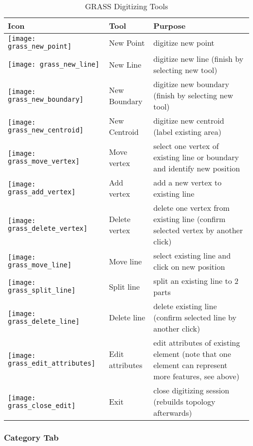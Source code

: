 \begin{table}[h]
\centering
\caption{GRASS Digitizing Tools}\label{tab:grass_tools}\medskip
 \begin{tabular}{|l|l|p{5in}|}
 \hline \textbf{Icon} & \textbf{Tool} & \textbf{Purpose} \\
\hline \texttt{[image: grass\_new\_point]} & New Point & digitize new point \\
\hline \texttt{[image: grass\_new\_line]} & New Line &  digitize new line (finish by selecting new tool) \\
\hline \texttt{[image: grass\_new\_boundary]} & New Boundary & digitize new boundary (finish by selecting new tool)\\
\hline \texttt{[image: grass\_new\_centroid]} & New Centroid & digitize new centroid (label existing area)\\
\hline \texttt{[image: grass\_move\_vertex]} & Move vertex & select one vertex of existing line or boundary and
identify new position\\
\hline \texttt{[image: grass\_add\_vertex]} & Add vertex & add a new vertex to existing line\\
\hline \texttt{[image: grass\_delete\_vertex]} & Delete vertex & delete one vertex from existing line (confirm selected
vertex by another click)\\
\hline \texttt{[image: grass\_move\_line]} & Move line & select existing line and click on new position\\
\hline \texttt{[image: grass\_split\_line]} & Split line & split an existing line to 2 parts\\
\hline \texttt{[image: grass\_delete\_line]} & Delete line & delete existing line (confirm selected line by another
click)\\
\hline \texttt{[image: grass\_edit\_attributes]} & Edit attributes & edit attributes of existing element (note that one
element can represent more features, see above)\\
\hline \texttt{[image: grass\_close\_edit]} & Exit & close digitizing session (rebuilds topology afterwards)\\
\hline
\end{tabular}
\end{table}

\subsubsection{Category Tab}

